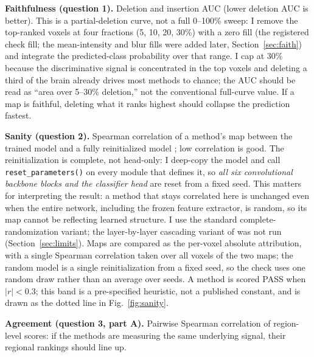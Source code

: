 \documentclass[11pt]{article}
\begin{document}
\textbf{Faithfulness (question 1).} Deletion and insertion AUC \citep{petsiuk2018} (lower
deletion AUC is better). This is a partial-deletion curve, not a full 0--100\% sweep: I remove
the top-ranked voxels at four fractions (5, 10, 20, 30\%) with a zero fill (the registered check fill; the mean-intensity and blur fills were added later, Section~\ref{sec:faith}) and integrate the
predicted-class probability over that range. I cap at 30\% because the discriminative signal
is concentrated in the top voxels and deleting a third of the brain already drives most methods
to chance; the AUC should be read as ``area over 5--30\% deletion,'' not the conventional
full-curve value. If a map is faithful, deleting what it ranks highest should collapse the
prediction fastest.

\textbf{Sanity (question 2).} Spearman correlation of a method's map between the trained model
and a fully reinitialized model \citep{adebayo2018}; low correlation is good. The
reinitialization is complete, not head-only: I deep-copy the model and call
\texttt{reset\_parameters()} on every module that defines it, so \emph{all six convolutional
backbone blocks and the classifier head} are reset from a fixed seed. This matters for
interpreting the result: a method that stays correlated here is unchanged even when the entire
network, including the frozen feature extractor, is random, so its map cannot be reflecting
learned structure. I use the standard complete-randomization variant; the layer-by-layer
cascading variant of \citet{adebayo2018} was not run (Section~\ref{sec:limits}). Maps are
compared as the per-voxel absolute attribution, with a single Spearman correlation taken over
all voxels of the two maps; the random model is a single reinitialization from a fixed seed, so
the check uses one random draw rather than an average over seeds. A method is scored PASS when
$|r|<0.3$; this band is a pre-specified heuristic, not a published constant, and is drawn as the
dotted line in Fig.~\ref{fig:sanity}.

\textbf{Agreement (question 3, part A).} Pairwise Spearman correlation of region-level scores:
if the methods are measuring the same underlying signal, their regional rankings should line
up.
\end{document}
